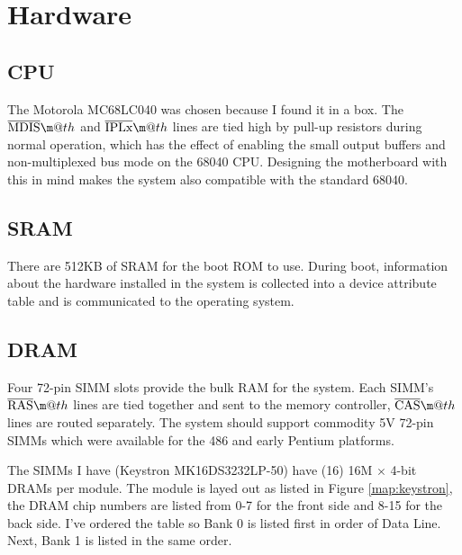 \documentclass{article}
\makeatletter
\newcommand*{\textoverline}[1]{$\overline{\hbox{#1}}\m@th$}
\makeatother
\begin{document}
\section{Hardware}

\subsection{CPU}

The Motorola MC68LC040 was chosen because I found it in a box. The
\textoverline{MDIS} and \textoverline{IPLx} lines are tied high by pull-up
resistors during normal operation, which has the effect of enabling the small
output buffers and non-multiplexed bus mode on the 68040 CPU. Designing the
motherboard with this in mind makes the system also compatible with the standard
68040.

\subsection{SRAM}

There are 512KB of SRAM for the boot ROM to use. During boot, information about
the hardware installed in the system is collected into a device attribute table
and is communicated to the operating system.

\subsection{DRAM}

Four 72-pin SIMM slots provide the bulk RAM for the system. Each SIMM's
\textoverline{RAS} lines are tied together and sent to the memory controller,
\textoverline{CAS} lines are routed separately. The system should support
commodity 5V 72-pin SIMMs which were available for the 486 and early Pentium
platforms.

The SIMMs I have (Keystron MK16DS3232LP-50) have (16) 16M $\times$ 4-bit DRAMs
per module. The module is layed out as listed in Figure \ref{map:keystron}, the
DRAM chip numbers are listed from 0-7 for the front side and 8-15 for the back
side. I've ordered the table so Bank 0 is listed first in order of Data Line.
Next, Bank 1 is listed in the same order.
\end{document}
